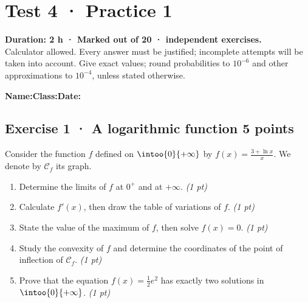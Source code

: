 \mxnewpage{}\label{sujet:6-1}

\section*{Test 4 · Practice 1}


\textbf{Duration: 2 h · Marked out of 20 ·  independent exercises.}\\Calculator allowed. Every answer must be justified; incomplete attempts will be taken into account. Give exact values; round probabilities to $10^{-6}$ and other approximations to $10^{-4}$, unless stated otherwise.

\smallskip\textbf{Name:}\enspace\dotfill\quad\textbf{Class:}\enspace\dotfill\quad\textbf{Date:}\enspace\dotfill

\subsection*{Exercise 1 · A logarithmic function \hfill 5 points}Consider the function $f$ defined on $\intoo{0}{+\infty}$ by $f(x)=\frac{3+\ln x}x$. We denote by $\mathcal C_f$ its graph.

\begin{enumerate}

\item Determine the limits of $f$ at $0^+$ and at $+\infty$. \hfill\textit{(1 pt)}

\item Calculate $f' (x)$, then draw the table of variations of $f$. \hfill\textit{(1 pt)}

\item State the value of the maximum of $f$, then solve $f(x)=0$. \hfill\textit{(1 pt)}

\item Study the convexity of $f$ and determine the coordinates of the point of inflection of $\mathcal C_f$. \hfill\textit{(1 pt)}

\item Prove that the equation $f(x)=\frac12 e^{2}$ has exactly two solutions in $\intoo{0}{+\infty}$. \hfill\textit{(1 pt)}

\end{enumerate}

